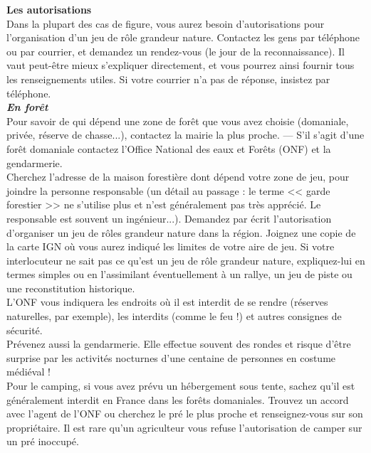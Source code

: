 \documentclass[11pt,twoside,a4paper]{article}
\begin{document}
\begin{multicols*}{2}

\textbf{\large Les autorisations}~\\

Dans la plupart des cas de figure, vous aurez besoin d'autorisations pour l'organisation d'un jeu de r{\^o}le grandeur nature. Contactez les gens par t{\'e}l{\'e}phone ou par courrier, et demandez un rendez-vous (le jour de la reconnaissance). Il vaut peut-{\^e}tre mieux s'expliquer directement, et vous pourrez ainsi fournir tous les renseignements utiles. Si votre courrier n'a pas de r{\'e}ponse, insistez par t{\'e}l{\'e}phone. ~\\

\textbf{\textit{\large En for{\^e}t}}~\\

Pour savoir de qui d{\'e}pend une zone de for{\^e}t que vous avez choisie (domaniale, priv{\'e}e, r{\'e}serve de chasse...), contactez la mairie la plus proche. --- S'il s'agit d'une for{\^e}t domaniale contactez l'Office National des eaux et For{\^e}ts (ONF) et la gendarmerie. ~\\

Cherchez l'adresse de la maison foresti{\`e}re dont d{\'e}pend votre zone de jeu, pour joindre la personne responsable (un d{\'e}tail au passage : le terme << garde forestier >> ne s'utilise plus et n'est g{\'e}n{\'e}ralement pas tr{\`e}s appr{\'e}ci{\'e}. Le responsable est souvent un ing{\'e}nieur...). Demandez par {\'e}crit l'autorisation d'organiser un jeu de r{\^o}les grandeur nature dans la r{\'e}gion. Joignez une copie de la carte IGN o{\`u} vous aurez indiqu{\'e} les limites de votre aire de jeu. Si votre interlocuteur ne sait pas ce qu'est un jeu de r{\^o}le grandeur nature, expliquez-lui en termes simples ou en l'assimilant  {\'e}ventuellement {\`a} un rallye, un jeu de piste ou une reconstitution historique. ~\\

L'ONF vous indiquera les endroits o{\`u} il est interdit de se rendre (r{\'e}serves naturelles, par exemple), les interdits (comme le feu !) et autres consignes de s{\'e}curit{\'e}. ~\\

Pr{\'e}venez aussi la gendarmerie. Elle effectue souvent des rondes et risque d'{\^e}tre surprise par les activit{\'e}s nocturnes d'une centaine de personnes en costume m{\'e}di{\'e}val ! ~\\

Pour le camping, si vous avez pr{\'e}vu un h{\'e}bergement sous tente, sachez qu'il est g{\'e}n{\'e}ralement interdit en France dans les for{\^e}ts domaniales. Trouvez un accord avec l'agent de l'ONF ou cherchez le pr{\'e} le plus proche et renseignez-vous sur son propri{\'e}taire. Il est rare qu'un agriculteur vous refuse l'autorisation de camper sur un pr{\'e} inoccup{\'e}. ~\\


\end{multicols*}
\end{document}
